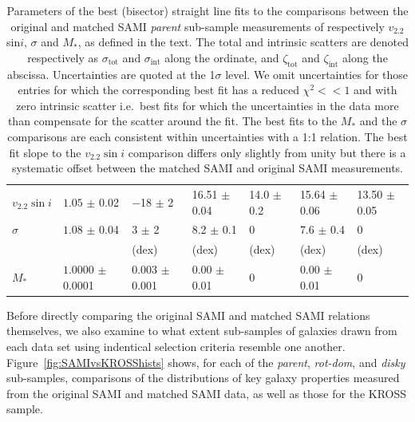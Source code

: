 \documentclass[a4paper,fleqn,usenatbib]{mnras}
\begin{document}
{\begin{table}
\begin{tabular}{ lllllll}
\hline
$v_{2.2}\sin i$ & $1.05$\phantom{00} $\pm$ 0.02	&	   	$-$18\phantom{.000} $\pm$ 2\phantom{.000} 		 & 16.51 $\pm$ 0.04  & 14.0 $\pm$ 0.2 					     & 15.64 $\pm$ 0.06 					   		& 13.50 $\pm$ 0.05 \\%
$\sigma$ & $1.08$\phantom{00} $\pm$ 0.04 & \phantom{$-$0}3\phantom{.000} $\pm$ 2\phantom{.700}  &  \phantom{0}8.2\phantom{0} $\pm$ 0.1\phantom{0}    &  \phantom{0}0\phantom{.0} \phantom{$\pm$ 0.2}  				& \phantom{1}7.6\phantom{4} $\pm$ 0.4\phantom{6}  & \phantom{1}0\phantom{.50} \phantom{$\pm$ 0.05}  \\%
\hline
 &    &  \phantom{-1}(dex) & (dex) & (dex) & (dex) & (dex) \\
\hline
$M_{*}$	& $1.0000$ $\pm$ 0.0001 	&	 \phantom{$-$0}0.003 $\pm$ 0.001    		 &  \phantom{0}0.00 $\pm$ 0.01  				   & \phantom{0}0\phantom{.0} \phantom{$\pm$ 0.2}  							 & \phantom{0}0.00 $\pm$ 0.01  			& \phantom{1}0\phantom{.50} \phantom{$\pm$ 0.05} \\%
\hline
\end{tabular}
\caption{Parameters of the best (bisector) straight line fits to the comparisons between the original and matched SAMI \textit{parent} sub-sample measurements of respectively $v_{2.2}$ sin$i$, $\sigma$ and $M_{*}$, as defined in the text. The total and intrinsic scatters are denoted respectively as $\sigma_{\text{tot}}$ and $\sigma_{\text{int}}$ along the ordinate, and $\zeta_{\text{tot}}$ and $\zeta_{\text{int}}$ along the abscissa. Uncertainties are quoted at the 1$\sigma$ level. We omit uncertainties for those entries for which the corresponding best fit has a reduced $\chi^{2} << 1$ and with zero intrinsic scatter i.e.\ best fits for which the uncertainties in the data more than compensate for the scatter around the fit. The best fits to the $M_{*}$ and the $\sigma$ comparisons are each consistent within uncertainties with a 1:1 relation. The best fit slope to the $v_{2.2}\sin i$ comparison differs only slightly from unity but there is a systematic offset between the matched SAMI and original SAMI measurements.}
\label{tab:HQLQ_directcomp}
\end{table}


Before directly comparing the original SAMI and matched SAMI relations themselves, we also examine to what extent sub-samples of galaxies drawn from each data set using indentical selection criteria resemble one another. Figure~\ref{fig:SAMIvsKROSShists} shows, for each of the \textit{parent}, \textit{rot-dom}, and \textit{disky} sub-samples, comparisons of the distributions of key galaxy properties measured from the original SAMI and matched SAMI data, as well as those for the KROSS sample.  

}
\end{document}
